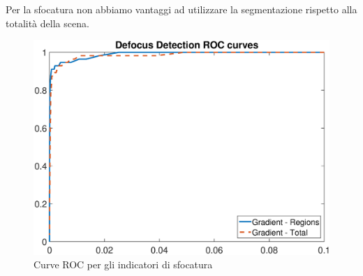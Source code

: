 Per la sfocatura non abbiamo vantaggi ad utilizzare la segmentazione rispetto alla totalit\`a della scena.\\ 
\begin{figure}[tb]
\centering
\includegraphics[width=13cm]{diagrammi/ROC_defocus}
\caption{Curve ROC per gli indicatori di sfocatura}
\label{fig:ROC_defocus}
\end{figure}


